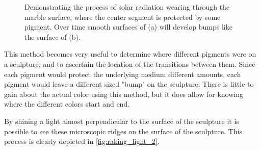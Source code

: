 \documentclass[10pt]{armath}
\begin{document}
\begin{figure}[htpb]
  \begin{center}
  \end{center}
  \caption{Demonstrating the process of solar radiation wearing through the
  marble surface, where the center segment is protected by some pigment. Over
  time smooth surfaces of (a) will develop bumps like the surface of (b).}
  \label{fig:raking_light_1}
\end{figure}

This method becomes very useful to determine where different pigments were on a
sculpture, and to ascertain the location of the transitions between them. Since
each pigment would protect the underlying medium different amounts, each
pigment would leave a different sized "bump" on the sculpture. There is little
to gain about the actual color using this method, but it does allow for knowing
where the different colors start and end.

By shining a light almost perpendicular to the surface of the sculpture it is
possible to see these microscopic ridges on the surface of the sculpture. This
process is clearly depicted in \ref{fig:raking_light_2}.
\end{document}
